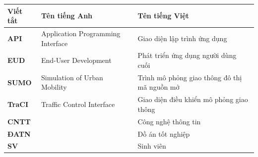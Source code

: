 \documentclass[../DoAn.tex]{subfiles}
\begin{document}
\begingroup
\setlength{\tabcolsep}{3pt}
\renewcommand{\arraystretch}{1.15}
\begin{longtable}{@{}p{} p{} p{}@{}}
	\hline
   \textbf{Viết tắt}  & \textbf{Tên tiếng Anh}	& \textbf{Tên tiếng Việt} \\ \hline 
	\textbf{API} & Application Programming Interface & Giao diện lập trình ứng dụng\\
	\textbf{EUD} & End-User Development & Phát triển ứng dụng người dùng cuối\\
	\textbf{SUMO} & Simulation of Urban Mobility & Trình mô phỏng giao thông đô thị mã nguồn mở\\
	\textbf{TraCI} & Traffic Control Interface & Giao diện điều khiển mô phỏng giao thông\\
	\textbf{CNTT }  &   & Công nghệ thông tin\\
	\textbf{ĐATN} &  & Đồ án tốt nghiệp \\
	\textbf{SV} &  & Sinh viên \\

    \hline
\end{longtable}
\endgroup
\end{document}
